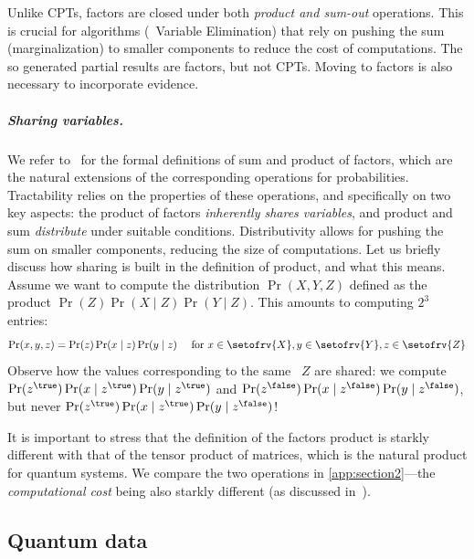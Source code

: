 Unlike CPTs, factors are closed under both \emph{product and sum-out} operations.
This is crucial for algorithms (\eg\ Variable Elimination) that rely on pushing the sum (marginalization) to smaller components to reduce the cost of computations.
The so generated partial results are factors, but not CPTs.
Moving to factors is also necessary to incorporate evidence.

\subparagraph{Sharing variables.}

We refer to~\cite{DarwicheHandbook} for the formal definitions of sum and product of factors, which are the natural extensions of the corresponding operations for probabilities.
Tractability relies on the properties of these operations, and specifically on two key aspects: the product of factors \emph{inherently shares variables}, and product and sum \emph{distribute} under suitable conditions. Distributivity allows for pushing the sum on smaller components, reducing the size of computations.
Let us briefly discuss how sharing is built in the definition of product, and what this means. 
Assume we want to compute the distribution $\Pr(X,Y,Z)$ defined as the product $ \Pr(Z) \Pr(X \mid Z) \Pr(Y \mid Z)$.
This amounts to computing $2^3$ entries:
\begin{equation*}
\Pr(x,y,z) = \Pr(z) \Pr(x \mid z) \Pr(y \mid z) \quad \text{ for } x\in \setofrv{X}, y\in \setofrv{Y}, z\in \setofrv{Z}
\end{equation*}
Observe how the values corresponding to the same \rv\ $Z$ are shared: we compute $\Pr(z^\true) \Pr(x \mid z^\true) \Pr(y \mid z^\true)$ and $\Pr(z^\false) \Pr(x \mid z^\false) \Pr(y \mid z^\false)$, but never $\Pr(z^\true) \Pr(x \mid z^\true) \Pr(y \mid z^\false)$!

It is important to stress that the definition of the factors product is starkly different with that of the tensor product of matrices, which is the natural product for quantum systems.
We compare the two operations in \cref{app:section2}---the \emph{computational cost} being also starkly different (as discussed in~\cite[Example~9.7]{popl24}).

\subsection{Quantum data}

